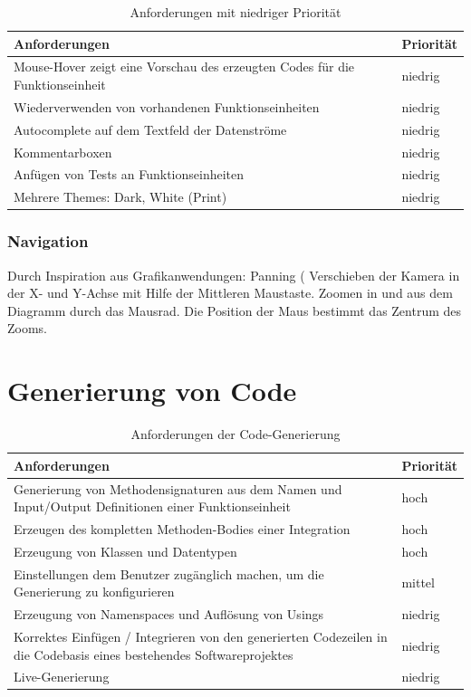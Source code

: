 \begin{table}[H]
\begin{tabularx}{\textwidth}{X|l}

	Anforderungen & Priorität\\
	\hline \hline
Mouse-Hover zeigt eine Vorschau des erzeugten Codes für die Funktionseinheit & niedrig\\ \hline
Wiederverwenden von vorhandenen Funktionseinheiten & niedrig\\ \hline
Autocomplete auf dem Textfeld der Datenströme & niedrig\\ \hline
Kommentarboxen & niedrig\\ \hline
Anfügen von Tests an Funktionseinheiten & niedrig\\ \hline
Mehrere Themes: Dark, White (Print) & niedrig\\ \hline
\end{tabularx}
\caption{Anforderungen mit niedriger Priorität}
\end{table}



\subsubsection{Navigation}

Durch Inspiration aus Grafikanwendungen: Panning ( Verschieben der Kamera in
der X- und Y-Achse mit Hilfe der Mittleren Maustaste. Zoomen in und aus dem
Diagramm durch das Mausrad. Die Position der Maus bestimmt das Zentrum des
Zooms.


\section{Generierung von Code}

\begin{table}[H]
\begin{tabularx}{\textwidth}{X|l}
Anforderungen & Priorität\\
\hline
\hline
Generierung von Methodensignaturen aus dem Namen und Input/Output Definitionen einer Funktionseinheit & hoch\\
\hline
Erzeugen des kompletten Methoden-Bodies einer Integration & hoch\\
\hline
Erzeugung von Klassen und Datentypen & hoch\\
\hline
Einstellungen  dem Benutzer zugänglich machen, um die Generierung zu konfigurieren & mittel\\
\hline
Erzeugung von Namenspaces und Auflösung von Usings & niedrig\\
\hline
Korrektes Einfügen / Integrieren von den generierten Codezeilen in die Codebasis eines bestehendes Softwareprojektes & niedrig\\
\hline
Live-Generierung & niedrig\\
\hline
\end{tabularx}
\caption{Anforderungen der Code-Generierung}
\end{table}


